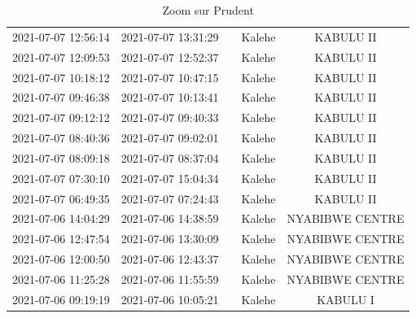 \documentclass[
]{book}
\begin{document}
\begin{table}

\caption{\label{tab:unnamed-chunk-13}Zoom sur Prudent}
\centering
\begin{tabular}[t]{c|c|>{}c|c|c}
\hline
\cellcolor{red}{start} & \cellcolor{red}{end} & \cellcolor{red}{temps} & \cellcolor{red}{Territoire} & \cellcolor{red}{Village}\\
\hline
2021-07-07 12:56:14 & 2021-07-07 13:31:29 & \cellcolor[HTML]{433D84}{\textcolor{white}{35}} & Kalehe & KABULU II\\
\hline
2021-07-07 12:09:53 & 2021-07-07 12:52:37 & \cellcolor[HTML]{1F988B}{\textcolor{white}{43}} & Kalehe & KABULU II\\
\hline
2021-07-07 10:18:12 & 2021-07-07 10:47:15 & \cellcolor[HTML]{440154}{\textcolor{white}{29}} & Kalehe & KABULU II\\
\hline
2021-07-07 09:46:38 & 2021-07-07 10:13:41 & \cellcolor[HTML]{414487}{\textcolor{white}{27}} & Kalehe & KABULU II\\
\hline
2021-07-07 09:12:12 & 2021-07-07 09:40:33 & \cellcolor[HTML]{471164}{\textcolor{white}{28}} & Kalehe & KABULU II\\
\hline
2021-07-07 08:40:36 & 2021-07-07 09:02:01 & \cellcolor[HTML]{A5DB36}{\textcolor{white}{21}} & Kalehe & KABULU II\\
\hline
2021-07-07 08:09:18 & 2021-07-07 08:37:04 & \cellcolor[HTML]{218E8D}{\textcolor{white}{28}} & Kalehe & KABULU II\\
\hline
2021-07-07 07:30:10 & 2021-07-07 15:04:34 & \cellcolor[HTML]{2C728E}{\textcolor{white}{454}} & Kalehe & KABULU II\\
\hline
2021-07-07 06:49:35 & 2021-07-07 07:24:43 & \cellcolor[HTML]{2C728E}{\textcolor{white}{35}} & Kalehe & KABULU II\\
\hline
2021-07-06 14:04:29 & 2021-07-06 14:38:59 & \cellcolor[HTML]{31688E}{\textcolor{white}{34}} & Kalehe & NYABIBWE CENTRE\\
\hline
2021-07-06 12:47:54 & 2021-07-06 13:30:09 & \cellcolor[HTML]{2A788E}{\textcolor{white}{42}} & Kalehe & NYABIBWE CENTRE\\
\hline
2021-07-06 12:00:50 & 2021-07-06 12:43:37 & \cellcolor[HTML]{1F988B}{\textcolor{white}{43}} & Kalehe & NYABIBWE CENTRE\\
\hline
2021-07-06 11:25:28 & 2021-07-06 11:55:59 & \cellcolor[HTML]{23888E}{\textcolor{white}{31}} & Kalehe & NYABIBWE CENTRE\\
\hline
2021-07-06 09:19:19 & 2021-07-06 10:05:21 & \cellcolor[HTML]{23888E}{\textcolor{white}{46}} & Kalehe & KABULU I\\

\end{tabular}
\end{table}
\end{document}
